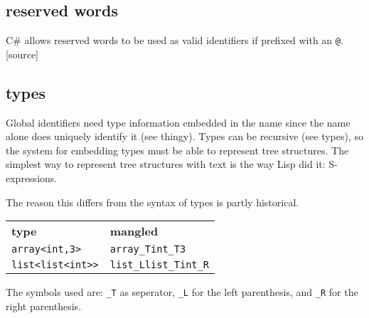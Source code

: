 \subsection{reserved words}
C\# allows reserved words to be used as valid identifiers if prefixed with an \verb|@|.[source]

\subsection{types}
Global identifiers need type information embedded in the name since the name alone does uniquely identify it (see thingy).
Types can be recursive (see types), so the system for embedding types must be able to represent tree structures.
The simplest way to represent tree structures with text is the way Lisp did it: S-expressions.

The reason this differs from the syntax of types is partly historical.

\begin{tabular}{ll}
\textbf{type}          & \textbf{mangled} \\
\verb|array<int,3>|    & \verb|array_Tint_T3| \\
\verb|list<list<int>>| & \verb|list_Llist_Tint_R| \\
\end{tabular}

The symbols used are: \verb|_T| as seperator, \verb|_L| for the left parenthesis, and \verb|_R| for the right parenthesis.


